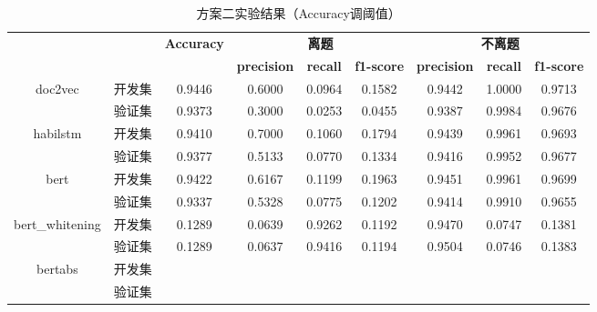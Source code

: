 \documentclass[11pt]{article}
\begin{document}
\begin{CJK}{UTF8}{gkai}
\begin{table}[htbp]\small
  \centering
  \begin{tabular}{cc|ccccccc}
    \hline
    \multicolumn{2}{c}{\multirow{2}[1]{*}{\textcolor[rgb]{ 1,  0,  0}{}}} & \multirow{2}[1]{*}{\textbf{Accuracy}} & \multicolumn{3}{c}{\textbf{离题}} & \multicolumn{3}{c|}{\textbf{不离题}} \\
    \multicolumn{2}{c}{} &       & \textbf{precision} & \textbf{recall} & \textbf{f1-score} & \textbf{precision} & \textbf{recall} & \multicolumn{1}{c}{\textbf{f1-score}} \\
    \hline
    \multirow{2}[0]{*}{doc2vec} & 开发集   & 0.9446  & 0.6000  & 0.0964  & 0.1582  & 0.9442  & 1.0000  & 0.9713  \\
    & 验证集   & 0.9373  & 0.3000  & 0.0253  & 0.0455  & 0.9387  & 0.9984  & 0.9676  \\
    \hline
    \multirow{2}[0]{*}{habilstm} & 开发集   & 0.9410  & 0.7000  & 0.1060  & 0.1794  & 0.9439  & 0.9961  & 0.9693  \\
    & 验证集   & 0.9377  & 0.5133  & 0.0770  & 0.1334  & 0.9416  & 0.9952  & 0.9677  \\
    \hline
    \multirow{2}[0]{*}{bert} & 开发集   & 0.9422  & 0.6167  & 0.1199  & 0.1963  & 0.9451  & 0.9961  & 0.9699  \\
    & 验证集   & 0.9337  & 0.5328  & 0.0775  & 0.1202  & 0.9414  & 0.9910  & 0.9655  \\
    \hline
    \multirow{2}[0]{*}{bert\_whitening} & 开发集   & 0.1289  & 0.0639  & 0.9262  & 0.1192  & 0.9470  & 0.0747  & 0.1381  \\
    & 验证集   & 0.1289  & 0.0637  & 0.9416  & 0.1194  & 0.9504  & 0.0746  & 0.1383  \\
    \hline
    \multirow{2}[0]{*}{bertabs} & 开发集   &       &       &       &       &       &       &  \\
    & 验证集   &       &       &       &       &       &       &  \\
    \hline
        \end{tabular}%
        \caption{方案二实验结果（Accuracy调阈值）}
  \label{tab:addlabel}%
\end{table}%



\end{CJK}
\end{document}
